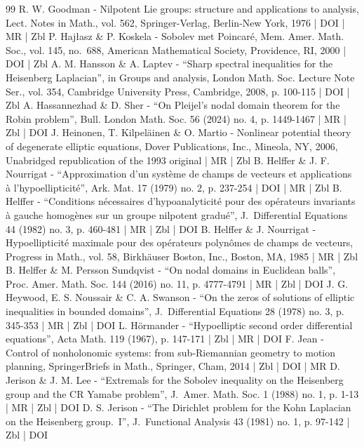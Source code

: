 \documentclass[10pt]{amsart}
\theoremstyle{definition}
\newcommand{\1}{\mathbbm{1}}
\begin{document}
\begin{thebibliography}{99}
R. W. Goodman - Nilpotent Lie groups: structure and applications to analysis, Lect. Notes in Math., vol. 562, Springer-Verlag, Berlin-New York, 1976 | DOI | MR | Zbl
P. Hajłasz \& P. Koskela - Sobolev met Poincaré, Mem. Amer. Math. Soc., vol. 145, no. 688, American Mathematical Society, Providence, RI, 2000 | DOI | Zbl
A. M. Hansson \& A. Laptev - “Sharp spectral inequalities for the Heisenberg Laplacian”, in Groups and analysis, London Math. Soc. Lecture Note Ser., vol. 354, Cambridge University Press, Cambridge, 2008, p. 100-115 | DOI | Zbl
A. Hassannezhad \& D. Sher - “On Pleijel’s nodal domain theorem for the Robin problem”, Bull. London Math. Soc. 56 (2024) no. 4, p. 1449-1467 | MR | Zbl | DOI
J. Heinonen, T. Kilpeläinen \& O. Martio - Nonlinear potential theory of degenerate elliptic equations, Dover Publications, Inc., Mineola, NY, 2006, Unabridged republication of the 1993 original | MR | Zbl
B. Helffer \& J. F. Nourrigat - “Approximation d’un système de champs de vecteurs et applications à l’hypoellipticité”, Ark. Mat. 17 (1979) no. 2, p. 237-254 | DOI | MR | Zbl
B. Helffer - “Conditions nécessaires d’hypoanalyticité pour des opérateurs invariants à gauche homogènes sur un groupe nilpotent gradué”, J. Differential Equations 44 (1982) no. 3, p. 460-481 | MR | Zbl | DOI
B. Helffer \& J. Nourrigat - Hypoellipticité maximale pour des opérateurs polynômes de champs de vecteurs, Progress in Math., vol. 58, Birkhäuser Boston, Inc., Boston, MA, 1985 | MR | Zbl
B. Helffer \& M. Persson Sundqvist - “On nodal domains in Euclidean balls”, Proc. Amer. Math. Soc. 144 (2016) no. 11, p. 4777-4791 | MR | Zbl | DOI
J. G. Heywood, E. S. Noussair \& C. A. Swanson - “On the zeros of solutions of elliptic inequalities in bounded domains”, J. Differential Equations 28 (1978) no. 3, p. 345-353 | MR | Zbl | DOI
L. Hörmander - “Hypoelliptic second order differential equations”, Acta Math. 119 (1967), p. 147-171 | Zbl | MR | DOI
F. Jean - Control of nonholonomic systems: from sub-Riemannian geometry to motion planning, SpringerBriefs in Math., Springer, Cham, 2014 | Zbl | DOI | MR
D. Jerison \& J. M. Lee - “Extremals for the Sobolev inequality on the Heisenberg group and the CR Yamabe problem”, J. Amer. Math. Soc. 1 (1988) no. 1, p. 1-13 | MR | Zbl | DOI
D. S. Jerison - “The Dirichlet problem for the Kohn Laplacian on the Heisenberg group. I”, J. Functional Analysis 43 (1981) no. 1, p. 97-142 | Zbl | DOI

\end{thebibliography}
\end{document}
